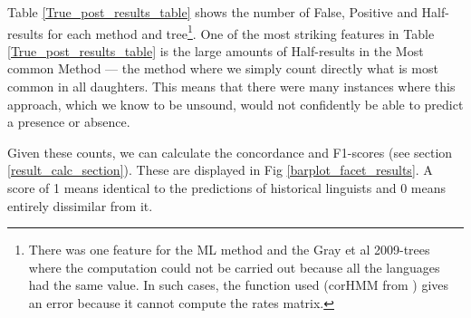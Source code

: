 \documentclass[a4paper,10pt]{article} %
\begin{document}

Table \ref{True_post_results_table} shows the number of False, Positive and Half-results for each method and tree\footnote{There was one feature for the ML method and the Gray et al 2009-trees where the computation could not be carried out because all the languages had the same value. In such cases, the function used (corHMM from \citet{corHMM}) gives an error because it cannot compute the rates matrix.}. One of the most striking features in Table \ref{True_post_results_table} is the large amounts of Half-results in the Most common Method --- the method where we simply count directly what is most common in all daughters. This means that there were many instances where this approach, which we know to be unsound, would not confidently be able to predict a presence or absence.
 


Given these counts, we can calculate the concordance and F1-scores (see section \ref{result_calc_section}). These are displayed in Fig \ref{barplot_facet_results}. A score of 1 means identical to the predictions of historical linguists and 0 means entirely dissimilar from it.
\end{document}
